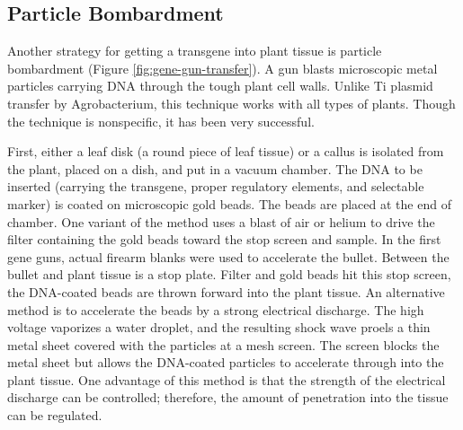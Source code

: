 \documentclass[nofonts,]{tufte-handout}
\begin{document}
\hypertarget{particle-bombardment}{%
\subsection{Particle Bombardment}\label{particle-bombardment}}

Another strategy for getting a transgene into plant tissue is particle
bombardment (Figure \ref{fig:gene-gun-transfer}). A gun blasts
microscopic metal particles carrying DNA through the tough plant cell
walls. Unlike Ti plasmid transfer by Agrobacterium, this technique works
with all types of plants. Though the technique is nonspecific, it has
been very successful.

First, either a leaf disk (a round piece of leaf tissue) or a callus is
isolated from the plant, placed on a dish, and put in a vacuum chamber.
The DNA to be inserted (carrying the transgene, proper regulatory
elements, and selectable marker) is coated on microscopic gold beads.
The beads are placed at the end of chamber. One variant of the method
uses a blast of air or helium to drive the filter containing the gold
beads toward the stop screen and sample. In the first gene guns, actual
firearm blanks were used to accelerate the bullet. Between the bullet
and plant tissue is a stop plate. Filter and gold beads hit this stop
screen, the DNA-coated beads are thrown forward into the plant tissue.
An alternative method is to accelerate the beads by a strong electrical
discharge. The high voltage vaporizes a water droplet, and the resulting
shock wave proels a thin metal sheet covered with the particles at a
mesh screen. The screen blocks the metal sheet but allows the DNA-coated
particles to accelerate through into the plant tissue. One advantage of
this method is that the strength of the electrical discharge can be
controlled; therefore, the amount of penetration into the tissue can be
regulated.
\end{document}
